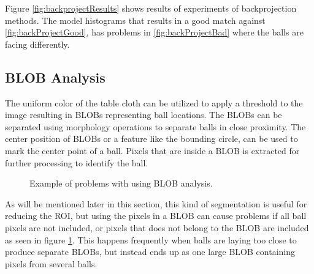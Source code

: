 Figure \ref{fig:backprojectResults} shows results of experiments of backprojection methods. The model histograms that results in a good match against \ref{fig:backProjectGood}, has problems in \ref{fig:backProjectBad} where the balls are facing differently.

\subsection{BLOB Analysis}
The uniform color of the table cloth can be utilized to apply a threshold to the image resulting in BLOBs representing ball locations. The BLOBs can be separated using morphology operations to separate balls in close proximity. The center position of BLOBs or a feature like the bounding circle, can be used to mark the center point of a ball. Pixels that are inside a BLOB is extracted for further processing to identify the ball.
\begin{figure}[htpb]
  \centering
  \quad           
   \caption{Example of problems with using BLOB analysis.}
  \label{fig:blobAnal}
\end{figure}
As will be mentioned later in this section, this kind of segmentation is useful for reducing the ROI, but using the pixels in a BLOB can cause problems if all ball pixels are not included, or pixels that does not belong to the BLOB are included as seen in figure \ref{fig:blobAnal}. This happens frequently when balls are laying too close to produce separate BLOBs, but instead ends up as one large BLOB containing pixels from several balls.

